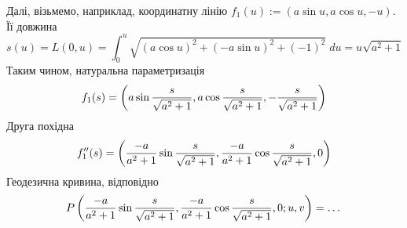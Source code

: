 \documentclass[8pt]{article} %
\begin{document}
	Далі, візьмемо, наприклад, координатну лінію $f_1(u):=(a\sin u, a\cos u,-u)$. Її довжина
	\[s(u)=L(0,u)=\int_0^u\sqrt{(a\cos u)^2+(-a\sin u)^2+(-1)^2}\;du=u\sqrt{a^2+1}\]
	Таким чином, натуральна параметризація
	\[f_1(s)=\left(a\sin\frac{s}{\sqrt{a^2+1}},a\cos\frac{s}{\sqrt{a^2+1}},-\frac{s}{\sqrt{a^2+1}}\right)\]
	Друга похідна
	\[f_1''(s)=\left(\frac{-a}{a^2+1}\sin\frac{s}{\sqrt{a^2+1}},\frac{-a}{a^2+1}\cos\frac{s}{\sqrt{a^2+1}},0\right)\]
	Геодезична кривина, відповідно
	\[P\left(\frac{-a}{a^2+1}\sin\frac{s}{\sqrt{a^2+1}},\frac{-a}{a^2+1}\cos\frac{s}{\sqrt{a^2+1}},0;u,v\right)=\dots\]
\end{document}
